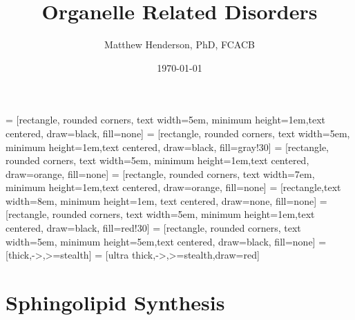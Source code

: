 \documentclass{scrartcl}
\author{Matthew Henderson, PhD, FCACB}
\date{\today}
\title{Organelle Related Disorders}
\begin{document}
\maketitle
\tableofcontents


 = [rectangle, rounded corners, text width=5em, minimum height=1em,text centered, draw=black, fill=none]
 = [rectangle, rounded corners, text width=5em, minimum height=1em,text centered, draw=black, fill=gray!30]
 = [rectangle, rounded corners, text width=5em, minimum height=1em,text centered, draw=orange, fill=none]
 = [rectangle, rounded corners, text width=7em, minimum height=1em,text centered, draw=orange, fill=none]
 = [rectangle,text width=8em, minimum height=1em, text centered, draw=none, fill=none]
 = [rectangle, rounded corners, text width=5em, minimum height=1em,text centered, draw=black, fill=red!30]
 = [rectangle, rounded corners, text width=5em, minimum height=5em,text centered, draw=black, fill=none]
 = [thick,->,>=stealth]
 = [ultra thick,->,>=stealth,draw=red]



\section{Sphingolipid Synthesis}
\label{sec:org1ac1d9e}
\end{document}
